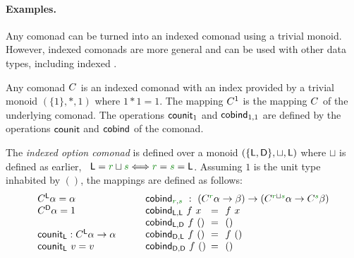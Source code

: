 
\paragraph{Examples.}

Any comonad can be turned into an indexed comonad using a trivial monoid. However, indexed comonads
are more general and can be used with other data types, including indexed . 

\begin{example}[Comonads]
Any comonad $C^{}$ is an indexed comonad with an index provided by a trivial monoid $(\{1\},\ast,1)$
where $1\ast 1 = 1$. The mapping $C^{1}$ is the mapping $C^{}$ of the underlying comonad. The
operations $\textnormal{\sffamily counit}_1$ and $\textnormal{\sffamily cobind}_{1,1}$ are defined by the operations $\textnormal{\sffamily counit}$
and $\textnormal{\sffamily cobind}$ of the comonad.
\end{example}

\begin{example}
The \emph{indexed option comonad} is defined over a monoid $(\{ \textnormal{\sffamily L},\textnormal{\sffamily D} \}, \sqcup,\textnormal{\sffamily L})$ 
where $\sqcup$ is defined as earlier, \ie~$\ident{L} = \cclrd{r} \sqcup \cclrd{s} \Longleftrightarrow \cclrd{r}=\cclrd{s}=\ident{L}$.
Assuming $1$ is the unit type inhabited by $()$, the mappings are defined as follows:
%
\begin{equation*}
\begin{array}{l}
\ctyp{\ident{L}}{\alpha} = \alpha\\
\ctyp{\ident{D}}{\alpha} = 1\\
\\
\ident{counit}_{\ident{L}} : \ctyp{\ident{L}}{\alpha} \rightarrow \alpha \\
\ident{counit}_{\ident{L}}~v = v\\
\end{array}
\qquad
\begin{array}{lcl}
\multicolumn{3}{l}{
  \ident{cobind}_{\cclrd{r},\cclrd{s}} ~:~ (\ctyp{\cclrd{r}}{\alpha} \rightarrow \beta) 
    \rightarrow (\ctyp{\cclrd{r}\sqcup\cclrd{s}}{\alpha} \rightarrow \ctyp{\cclrd{s}}{\beta}) }\\
\ident{cobind}_{\ident{L},\ident{L}}~f~x &\narrow{=}& f~x\\
\ident{cobind}_{\ident{L},\ident{D}}~f~() &\narrow{=}& ()\\
\ident{cobind}_{\ident{D},\ident{L}}~f~() &\narrow{=}& f~()\\
\ident{cobind}_{\ident{D},\ident{D}}~f~() &\narrow{=}& ()\\
\end{array}
\end{equation*}
\end{example}

